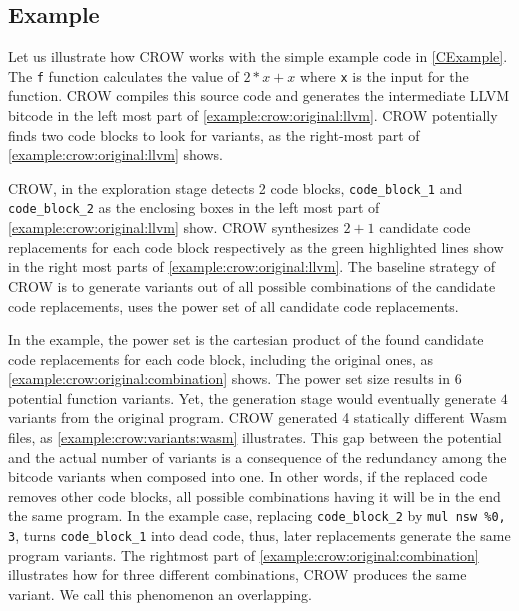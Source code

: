 
\subsection{Example}
\label{section:crow:example}
 Let us illustrate how CROW works with the simple example code in \autoref{CExample}. The \texttt{f} function calculates the value of $2 * x + x$ where \texttt{x} is the input for the function.  CROW compiles this source code and generates the intermediate LLVM bitcode in the left most part of \autoref{example:crow:original:llvm}. CROW potentially finds two code blocks to look for variants, as the right-most part of \autoref{example:crow:original:llvm} shows.


    

CROW, in the exploration stage detects 2 code blocks, \texttt{code\_block\_1} and \texttt{code\_block\_2} as the enclosing boxes in the left most part of \autoref{example:crow:original:llvm} show. CROW synthesizes $2 + 1$ candidate code replacements for each code block respectively as the green highlighted lines show in the right most parts of \autoref{example:crow:original:llvm}.
The baseline strategy of CROW is to generate variants out of all possible combinations of the candidate code replacements, \ie uses the power set of all candidate code replacements.

In the example, the power set is the cartesian product of the found candidate code replacements for each code block, including the original ones, as \autoref{example:crow:original:combination} shows. The power set size results in $6$ potential function variants. Yet, the generation stage would eventually generate $4$ variants from the original program. CROW generated 4 statically different Wasm  files, as \autoref{example:crow:variants:wasm} illustrates. This gap between the potential and the actual number of variants is a consequence of the redundancy among the bitcode variants when composed into one. In other words, if the replaced code removes other code blocks, all possible combinations having it will be in the end the same program. In the example case, replacing \texttt{code\_block\_2} by \texttt{mul nsw \%0, 3}, turns \texttt{code\_block\_1} into dead code, thus, later replacements generate the same program variants. The rightmost part of \autoref{example:crow:original:combination} illustrates how for three different combinations, CROW produces the same variant. We call this phenomenon an overlapping.

